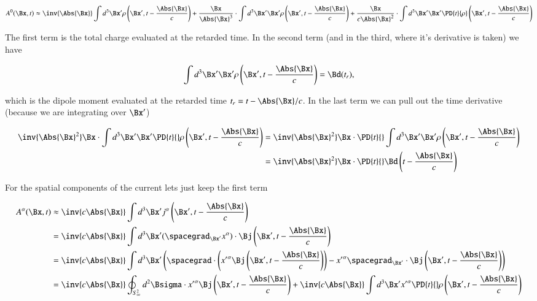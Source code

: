 \begin{equation}\label{eqn:relativisticElectrodynamicsL20:210}
A^0(\Bx, t) 
\approx 
\inv{\Abs{\Bx} } \int d^3 \Bx' \rho\left(\Bx', t - \frac{\Abs{\Bx} }{c}\right)
+\frac{\Bx}{\Abs{\Bx}^3} \cdot \int d^3 \Bx' \Bx' \rho \left(\Bx', t - \frac{\Abs{\Bx} }{c}\right)
+\frac{\Bx}{c \Abs{\Bx}^2} \cdot \int d^3 \Bx' \Bx' \PD{t}{\rho}\left(\Bx', t - \frac{\Abs{\Bx} }{c}\right)
\end{equation}

The first term is the total charge evaluated at the retarded time.  In the second term (and in the third, where it's derivative is taken) we have

\begin{equation}\label{eqn:relativisticElectrodynamicsL20:230}
\int d^3 \Bx' \Bx' \rho\left(\Bx', t - \frac{\Abs{\Bx} }{c}\right) = \Bd(t_r),
\end{equation}

which is the dipole moment evaluated at the retarded time $t_r = t - \Abs{\Bx}/c$.  In the last term we can pull out the time derivative (because we are integrating over $\Bx'$)

\begin{align*}
\inv{\Abs{\Bx}^2} \Bx \cdot \int d^3 \Bx' \Bx' \PD{t}{} \rho\left(\Bx', t - \frac{\Abs{\Bx} }{c}\right)
&=
\inv{\Abs{\Bx}^2} \Bx \cdot \PD{t}{} \int d^3 \Bx' \Bx' \rho\left(\Bx', t - \frac{\Abs{\Bx} }{c}\right) \\
&=
\inv{\Abs{\Bx}^2} \Bx \cdot \PD{t}{}\Bd \left(t - \frac{\Abs{\Bx} }{c}\right)
\end{align*}

For the spatial components of the current lets just keep the first term

\begin{align*}
A^\alpha(\Bx, t) 
&\approx
\inv{ c \Abs{\Bx} } \int d^3 \Bx' j^\alpha\left(\Bx', t - \frac{\Abs{\Bx} }{c}\right) \\
&=
\inv{ c \Abs{\Bx} } \int d^3 \Bx' (\spacegrad_{\Bx'} x^\alpha) \cdot \Bj\left(\Bx', t - \frac{\Abs{\Bx} }{c}\right)  \\
&=
\inv{ c \Abs{\Bx} } \int d^3 \Bx' 
\left(
\spacegrad \cdot \left( {x'}^\alpha \Bj \left(\Bx', t - \frac{\Abs{\Bx} }{c}\right) \right)
- {x'}^\alpha \spacegrad_{\Bx'} \cdot \Bj\left(\Bx', t - \frac{\Abs{\Bx} }{c}\right) 
\right) \\
&=
\inv{ c \Abs{\Bx} } \oint_{S^2_\infty} d^2 \Bsigma \cdot {x'}^\alpha \Bj\left(\Bx', t - \frac{\Abs{\Bx} }{c}\right)
+\inv{ c \Abs{\Bx} } \int d^3 \Bx' {x'}^\alpha \PD{t}{}\rho\left(\Bx', t - \frac{\Abs{\Bx} }{c}\right)
\end{align*}

